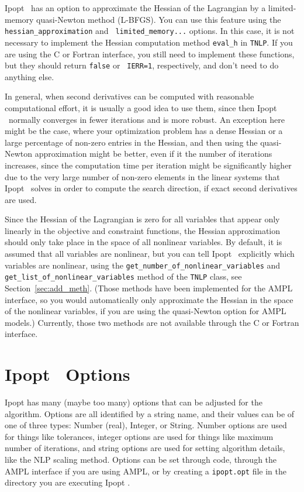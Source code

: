 \documentclass[10pt]{article}
\newcommand{\Ipopt}{{\sc Ipopt }}
\begin{document}
\Ipopt\ has an option to approximate the Hessian of the Lagrangian by
a limited-memory quasi-Newton method (L-BFGS).  You can use this
feature using the {\tt hessian\_approximation} and {\tt
  limited\_memory...} options.  In this case, it is not necessary to
implement the Hessian computation method {\tt eval\_h} in {\tt TNLP}.
If you are using the C or Fortran interface, you still need to
implement these functions, but they should return {\tt false} or {\tt
  IERR=1}, respectively, and don't need to do anything else.

In general, when second derivatives can be computed with reasonable
computational effort, it is usually a good idea to use them, since
then \Ipopt\ normally converges in fewer iterations and is more
robust.  An exception here might be the case, where your optimization
problem has a dense Hessian or a large percentage of non-zero entries
in the Hessian, and then using the quasi-Newton approximation might be
better, even if it the number of iterations increases, since the
computation time per iteration might be significantly higher due to
the very large number of non-zero elements in the linear systems that
\Ipopt\ solves in order to compute the search direction, if exact
second derivatives are used.

Since the Hessian of the Lagrangian is zero for all variables that
appear only linearly in the objective and constraint functions, the
Hessian approximation should only take place in the space of all
nonlinear variables.  By default, it is assumed that all variables are
nonlinear, but you can tell \Ipopt\ explicitly which variables are
nonlinear, using the {\tt get\_number\_of\_nonlinear\_variables} and
{\tt get\_list\_of\_nonlinear\_variables} method of the {\tt TNLP}
class, see Section~\ref{sec:add_meth}.  (Those methods have been
implemented for the AMPL interface, so you would automatically only
approximate the Hessian in the space of the nonlinear variables, if
you are using the quasi-Newton option for AMPL models.)  Currently,
those two methods are not available through the C or Fortran
interface.

\section{\Ipopt\ Options}\label{sec:options}
Ipopt has many (maybe too many) options that can be adjusted for the
algorithm.  Options are all identified by a string name, and their
values can be of one of three types: Number (real), Integer, or
String. Number options are used for things like tolerances, integer
options are used for things like maximum number of iterations, and
string options are used for setting algorithm details, like the NLP
scaling method. Options can be set through code, through the AMPL
interface if you are using AMPL, or by creating a {\tt ipopt.opt}
file in the directory you are executing \Ipopt.
\end{document}
